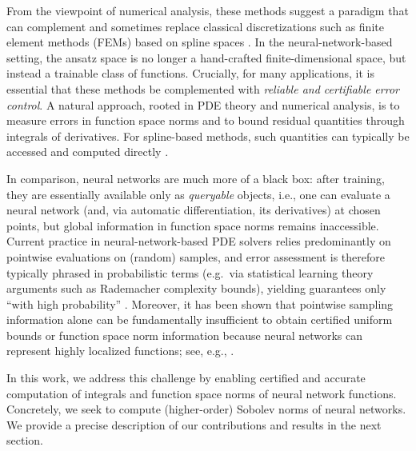 \documentclass[a4paper, 11pt]{article}
\begin{document}
	From the viewpoint of numerical analysis, these methods suggest a paradigm that can complement and sometimes replace classical discretizations such as finite element methods (FEM{s}) based on spline spaces \cite{verfurth2013posteriori}. In the neural-network-based setting, the ansatz space is no longer a hand-crafted finite-dimensional space, but instead a trainable class of functions. Crucially, for many applications, it is essential that these methods be complemented with \emph{reliable and certifiable error control}. A natural approach, rooted in PDE theory and numerical analysis, is to measure errors in function space norms and to bound residual quantities through integrals of derivatives. For spline-based methods, such quantities can typically be accessed and computed directly \cite{babuska1978posteriori,ainsworth1997posteriori,verfurth2013posteriori}.
	
	
	In comparison, neural networks are much more of a black box: after training, they are essentially available only as \emph{queryable} objects, i.e., one can evaluate a neural network (and, via automatic differentiation, its derivatives) at chosen points, but global information in function space norms remains inaccessible.
	Current practice in neural-network-based PDE solvers relies predominantly on pointwise evaluations on (random) samples, and error assessment is therefore typically phrased in probabilistic terms (e.g.\ via statistical learning theory arguments such as Rademacher complexity bounds), yielding guarantees only ``with high probability'' \cite{shalev2014understanding,neyshabur2018bounds}.
	Moreover, it has been shown that pointwise sampling information alone can be fundamentally insufficient to obtain certified uniform bounds or function space norm information because neural networks can represent highly localized functions; see, e.g., \cite{grohsvoigtlaendergap}.
	
	In this work, we address this challenge by enabling certified and accurate computation of integrals and function space norms of neural network functions. Concretely, we seek to compute (higher-order) Sobolev norms of neural networks. We provide a precise description of our contributions and results in the next section.
\end{document}
